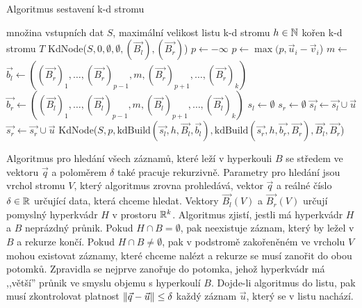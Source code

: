 \begin{algorithm}[ht!]
  \caption{Algoritmus sestavení k-d stromu}
  \label{algo:kd-tree-build}
  \begin{algorithmic}
    \Require množina vstupních dat $S$, maximální velikost listu k-d stromu $h \in \mathbb{N}$
    \Ensure kořen k-d stromu $T$
      \State \Return {}
    \EndProcedure
        \State \Return KdNode($S, 0, \emptyset, \emptyset, (\vec{B_l}), (\vec{B_r})$) 
      \EndIf
      \State $p \leftarrow -\infty$
         
          \State $p \leftarrow \max(p, \vec{u}_i - \vec{v}_i$)
        \EndFor
      \EndFor
      \State $m \leftarrow$ 
      \State $\vec{b_l} \leftarrow ((\vec{B_r})_1, \ldots, (\vec{B_r})_{p-1}, m, (\vec{B_r})_{p+1}, \ldots, (\vec{B_r})_k)$
      \State $\vec{b_r} \leftarrow ((\vec{B_l})_1, \ldots, (\vec{B_l})_{p-1}, m, (\vec{B_l})_{p+1}, \ldots, (\vec{B_l})_k)$
      \State $s_l \leftarrow \emptyset$
      \State $s_r \leftarrow \emptyset$
          \State $\vec{s_l} \leftarrow \vec{s_l} \cup \vec{u}$
        \Else
          \State $\vec{s_r} \leftarrow \vec{s_r} \cup \vec{u}$
        \EndIf
      \EndFor
      \State \Return KdNode($S, p, \textrm{kdBuild}(\vec{s_l}, h, \vec{B_l}, \vec{b_l}), \textrm{kdBuild}(\vec{s_r}, h, \vec{b_r}, \vec{B_r}), \vec{B_l}, \vec{B_r}$)
    \EndProcedure
  \end{algorithmic}
\end{algorithm}

Algoritmus pro hledání všech záznamů, které leží v hyperkouli $B$ se středem ve vektoru $\vec{q}$ a poloměrem $\delta$ také pracuje rekurzivně. Parametry pro hledání jsou vrchol stromu $V$, který algoritmus zrovna prohledává, vektor $\vec{q}$ a reálné číslo $\delta \in \mathbb{R}$ určující data, která chceme hledat. Vektory $\vec{B_l}(V)$ a $\vec{B_r}(V)$ určují pomyslný hyperkvádr $H$ v prostoru $\mathbb{R}^k$. Algoritmus zjistí, jestli má hyperkvádr $H$ a $B$ neprázdný průnik. Pokud $H \cap B = \emptyset$, pak neexistuje záznam, který by ležel v $B$ a rekurze končí. Pokud $H \cap B \neq \emptyset$, pak v podstromě zakořeněném ve vrcholu $V$ mohou existovat záznamy, které chceme nalézt a rekurze se musí zanořit do obou potomků. Zpravidla se nejprve zanořuje do potomka, jehož hyperkvádr má ,,větší'' průnik ve smyslu objemu s hyperkoulí $B$. Dojde-li algoritmus do listu, pak musí zkontrolovat platnost $\|\vec{q} - \vec{u}\| \leq \delta$ každý záznam $\vec{u}$, který se v listu nachází. 

